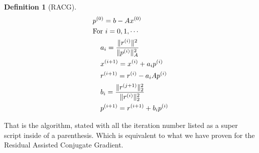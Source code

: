 \documentclass[]{article}
\theoremstyle{definition}
\newtheorem{definition}{Definition}
\begin{document}
            \begin{definition}[RACG]
                \begin{align}
                    & p^{(0)} = b - Ax^{(0)} 
                    \\&
                    \text{For } i = 0,1, \cdots
                    \\&\hspace{1.1em}
                    \begin{aligned}
                        & a_{i} = \frac{\Vert r^{(i)}\Vert^2}{\Vert p^{(i)}\Vert^2_A}
                        \\
                        & x^{(i + 1)} = x^{(i)} + a_i p^{(i)}
                        \\
                        & r^{(i + 1)} = r^{(i)} - a_iAp^{(i)}
                        \\
                        & b_{i} = \frac{\Vert r^{(j + 1)}\Vert_2^2}{\Vert r^{(i)}\Vert_2^2}
                        \\
                        & p^{(i + 1)} = r^{(i + 1)} + b_{i}p^{(i)}
                    \end{aligned}
                \end{align}
            \end{definition}
            That is the algorithm, stated with all the iteration number listed as a super script inside of a parenthesis. Which is equivalent to what we have proven for the Residual Assisted Conjugate Gradient. 
\end{document}
